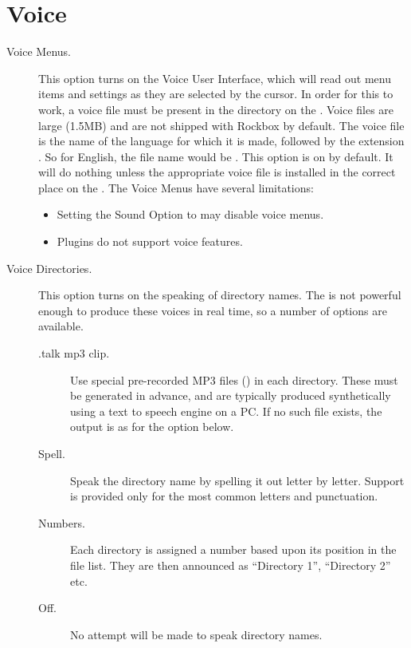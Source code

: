 \section{\label{ref:Voiceconfiguration}Voice}

  \begin{description}
  \item[Voice Menus.]
    This option turns on the Voice User Interface, which will read out menu
    items and settings as they are selected by the cursor.  In order for this
    to work, a voice file must be present in the 
    directory on the \dap.  Voice files are large (1.5MB) and are not 
    shipped with Rockbox by default.
    The voice file is the name of the language for which it is made, followed
    by the extension .  So for English, the file name would be 
    .
    This option is on by default.  It will do nothing unless the 
    appropriate voice file is installed in the correct place on the \dap.
    The Voice Menus have several limitations:
    \begin{itemize}
    \item Setting the Sound Option  to  may 
      disable voice menus.
    \item Plugins  do not support
      voice features.
    \end{itemize}

  \item[Voice Directories.]
    This option turns on the speaking of directory names.  The \dap{} 
    is not powerful enough to produce these voices in real time, so a number 
    of options are available.
    \begin{description}
    \item[.talk mp3 clip.]
      Use special pre-recorded MP3 files () in each 
      directory.  These must be generated in advance, and are typically 
      produced synthetically using a text to speech engine on a PC.
      If no such file exists, the output is as for the 
      option below.
    \item[Spell.]
      Speak the directory name by spelling it out letter by letter.  Support
      is provided only for the most common letters and punctuation.
    \item[Numbers.]
      Each directory is assigned a number based upon its position in the
      file list.  They are then announced as ``Directory 1'', ``Directory 2''
      etc.
    \item[Off.]
      No attempt will be made to speak directory names.
    \end{description}


\end{description}
